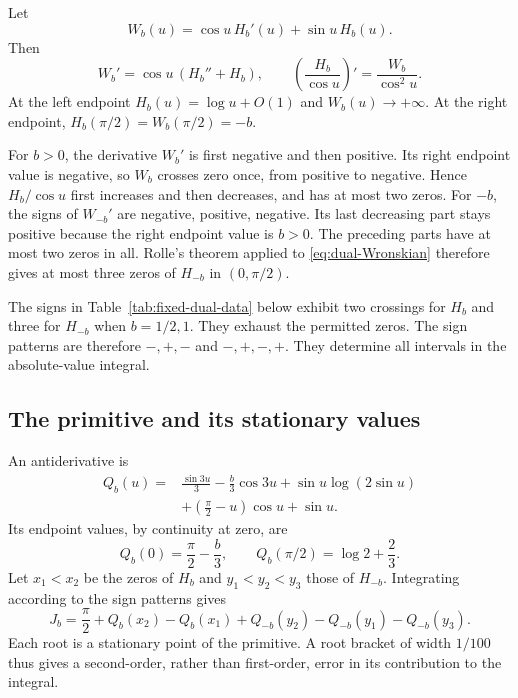 \documentclass[11pt,reqno]{amsart}
\numberwithin{equation}{section}
\theoremstyle{definition}
\theoremstyle{remark}
\begin{document}
Let
\[
 W_b(u)=\cos u\,H_b'(u)+\sin u\,H_b(u).
\]
Then
\begin{equation}\label{eq:dual-Wronskian}
 W_b'=\cos u\,(H_b''+H_b),\qquad
 \left(\frac{H_b}{\cos u}\right)'=\frac{W_b}{\cos^2u}.
\end{equation}
At the left endpoint $H_b(u)=\log u+O(1)$ and $W_b(u)\to+\infty$. At the right endpoint, $H_b(\pi/2)=W_b(\pi/2)=-b$.

For $b>0$, the derivative $W_b'$ is first negative and then positive. Its right endpoint value is negative, so $W_b$ crosses zero once, from positive to negative. Hence $H_b/\cos u$ first increases and then decreases, and has at most two zeros. For $-b$, the signs of $W_{-b}'$ are negative, positive, negative. Its last decreasing part stays positive because the right endpoint value is $b>0$. The preceding parts have at most two zeros in all. Rolle's theorem applied to \eqref{eq:dual-Wronskian} therefore gives at most three zeros of $H_{-b}$ in $(0,\pi/2)$.

The signs in Table~\ref{tab:fixed-dual-data} below exhibit two crossings for $H_b$ and three for $H_{-b}$ when $b=1/2,1$. They exhaust the permitted zeros. The sign patterns are therefore $-,+,-$ and $-,+,-,+$. They determine all intervals in the absolute-value integral.

\subsection{The primitive and its stationary values}
An antiderivative is
\begin{equation}\label{eq:dual-primitive}
 \begin{split}
 Q_b(u)={}&\frac{\sin3u}{3}-\frac b3\cos3u
 +\sin u\log(2\sin u)\\
 &+\left(\frac\pi2-u\right)\cos u+\sin u.
 \end{split}
\end{equation}
Its endpoint values, by continuity at zero, are
\[
 Q_b(0)=\frac\pi2-\frac b3,\qquad Q_b(\pi/2)=\log2+\frac23.
\]
Let $x_1<x_2$ be the zeros of $H_b$ and $y_1<y_2<y_3$ those of $H_{-b}$. Integrating according to the sign patterns gives
\begin{equation}\label{eq:dual-exact-integral}
 J_b=\frac\pi2+Q_b(x_2)-Q_b(x_1)
          +Q_{-b}(y_2)-Q_{-b}(y_1)-Q_{-b}(y_3).
\end{equation}
Each root is a stationary point of the primitive. A root bracket of width $1/100$ thus gives a second-order, rather than first-order, error in its contribution to the integral.
\end{document}
